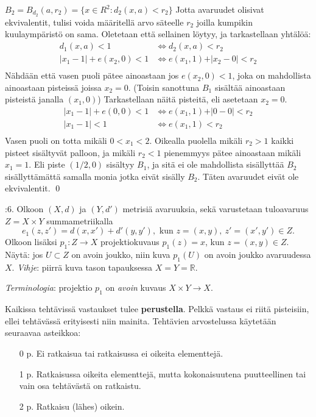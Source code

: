 \documentclass[12pt,a4paper,leqno]{amsart}
\begin{document}
$B_2 = B_{d_2}(a, r_2) = \{x \in R^2 : d_2(x, a) < r_2\} $
Jotta avaruudet olisivat ekvivalentit,  tulisi voida määritellä arvo säteelle $r_2$ joilla kumpikin kuulaympäristö on sama.
Oletetaan että sellainen löytyy, ja tarkastellaan yhtälöä:
\begin{align*}
    d_1(x, a) < 1 &\iff d_2(x, a) < r_2 \\
    \vert x_1 - 1 \vert + e(x_2,0) < 1 &\iff e(x_1,1) + \vert x_2 - 0 \vert < r_2 \\
\end{align*}
Nähdään että vasen puoli pätee ainoastaan jos $e(x_2, 0) < 1$, joka on mahdollista ainoastaan pisteissä joissa $x_2 = 0$. (Toisin sanottuna $B_1$ sisältää ainoastaan pisteistä janalla $(x_1, 0)$) Tarkastellaan näitä pisteitä, eli asetetaan $x_2=0$.
\begin{align*}
    \vert x_1 - 1 \vert + e(0,0) < 1 &\iff e(x_1,1) + \vert 0 - 0 \vert < r_2 \\
    \vert x_1 - 1 \vert  < 1 &\iff e(x_1,1) < r_2 \\
\end{align*}
Vasen puoli on totta mikäli $0 < x_1 < 2$. Oikealla puolella mikäli $r_2 > 1$ kaikki pisteet sisältyvät palloon, ja mikäli $r_2 < 1$ pienemmyys pätee ainoastaan mikäli $x_1 = 1$. Eli piste $(1/2, 0)$ sisältyy $B_1$, ja sitä ei ole mahdollista sisällyttää $B_2$  sisällyttämättä samalla monia jotka eivät sisälly $B_2$. Täten avaruudet eivät ole ekvivalentit. \qed
\bigskip

:6. Olkoon $(X,d)$ ja $(Y,d')$ metrisiä avaruuksia, sekä varustetaan tuloavaruus $Z = X \times Y$ summametriikalla 
\[
e_1(z,z') = d(x,x') + d'(y,y'),  \textrm{ kun }  z = (x,y),\  z' = (x',y') \in Z.
\]
Olkoon lisäksi $p_1: Z \to X$ projektiokuvaus $p_1(z) = x$,  kun $z = (x,y) \in Z$. Näytä: jos $U \subset Z$ on avoin joukko, niin 
kuva $p_1(U)$ on avoin joukko avaruudessa $X$. \textit{Vihje}:  piirrä kuva tason tapauksessa $X = Y = \mathbb R$.

\smallskip

\textit{Terminologia}: projektio $p_1$ on \textit{avoin} kuvaus  $X \times Y \to X$. 

\bigskip

Kaikissa tehtävissä vastaukset tulee \textbf{perustella}. Pelkkä vastaus ei riitä pisteisiin, ellei tehtävässä erityisesti niin mainita.
Tehtävien arvostelussa käytetään seuraavaa asteikkoa: 
\begin{itemize}
\item [0 p.] Ei ratkaisua tai ratkaisussa ei oikeita elementtejä.
\item [1 p.] Ratkaisussa oikeita elementtejä, mutta kokonaisuutena puutteellinen tai vain osa tehtävästä on ratkaistu.
\item [2 p.] Ratkaisu (lähes) oikein.
\end{itemize}
\end{document}
